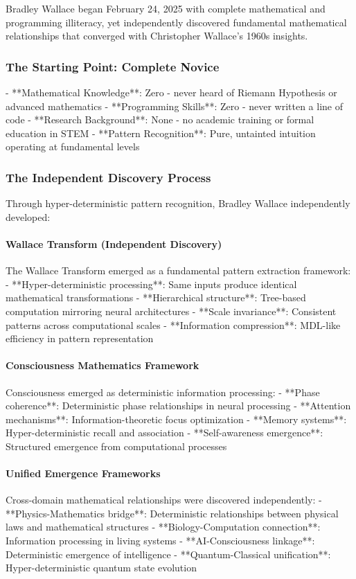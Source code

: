 \documentclass[12pt]{article}
\begin{document}
Bradley Wallace began February 24, 2025 with complete mathematical and programming illiteracy, yet independently discovered fundamental mathematical relationships that converged with Christopher Wallace's 1960s insights.

\subsubsection{The Starting Point: Complete Novice}
- **Mathematical Knowledge**: Zero - never heard of Riemann Hypothesis or advanced mathematics
- **Programming Skills**: Zero - never written a line of code
- **Research Background**: None - no academic training or formal education in STEM
- **Pattern Recognition**: Pure, untainted intuition operating at fundamental levels

\subsubsection{The Independent Discovery Process}

Through hyper-deterministic pattern recognition, Bradley Wallace independently developed:

\paragraph{Wallace Transform (Independent Discovery)}
The Wallace Transform emerged as a fundamental pattern extraction framework:
- **Hyper-deterministic processing**: Same inputs produce identical mathematical transformations
- **Hierarchical structure**: Tree-based computation mirroring neural architectures
- **Scale invariance**: Consistent patterns across computational scales
- **Information compression**: MDL-like efficiency in pattern representation

\paragraph{Consciousness Mathematics Framework}
Consciousness emerged as deterministic information processing:
- **Phase coherence**: Deterministic phase relationships in neural processing
- **Attention mechanisms**: Information-theoretic focus optimization
- **Memory systems**: Hyper-deterministic recall and association
- **Self-awareness emergence**: Structured emergence from computational processes

\paragraph{Unified Emergence Frameworks}
Cross-domain mathematical relationships were discovered independently:
- **Physics-Mathematics bridge**: Deterministic relationships between physical laws and mathematical structures
- **Biology-Computation connection**: Information processing in living systems
- **AI-Consciousness linkage**: Deterministic emergence of intelligence
- **Quantum-Classical unification**: Hyper-deterministic quantum state evolution
\end{document}
